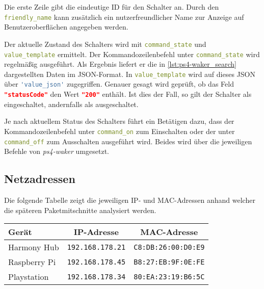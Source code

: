 Die erste Zeile gibt die eindeutige ID für den Schalter an.
Durch den \lstinline[language=yaml]{friendly_name} kann zusätzlich ein nutzerfreundlicher Name zur Anzeige auf Benutzeroberflächen angegeben werden.

Der aktuelle Zustand des Schalters wird mit \lstinline[language=yaml]{command_state}
und \\
\lstinline[language=yaml]{value_template} ermittelt.
Der Kommandozeilenbefehl unter \lstinline[language=yaml]{command_state} wird regelmäßig ausgeführt.
Als Ergebnis liefert er die in \autoref{lst:ps4-waker_search} dargestellten Daten im JSON-Format.
In \lstinline[language=yaml]{value_template} wird auf dieses JSON über
\lstinline[language=yaml]{'value_json'} zugegriffen.
Genauer gesagt wird geprüft,
ob das Feld \lstinline[language=json]{"statusCode"} den Wert
\lstinline[language=json]{"200"} enthält.
Ist dies der Fall, so gilt der Schalter als eingeschaltet, andernfalls als ausgeschaltet.



Je nach aktuellem Status des Schalters führt ein Betätigen dazu, dass der Kommandozeilenbefehl unter \lstinline[language=yaml]{command_on} zum Einschalten
oder der unter \lstinline[language=yaml]{command_off} zum Ausschalten ausgeführt wird.
Beides wird über die jeweiligen Befehle von \textit{ps4-waker} umgesetzt.

\subsection{Netzadressen}\label{sec:aufbau-adressen}
Die folgende Tabelle zeigt die jeweiligen IP- und MAC-Adressen anhand welcher die
späteren Paketmitschnitte analysiert werden. \\

\begin{center}
    \begin{tabular}{l||c|c}
        Gerät           & IP-Adresse                &  MAC-Adresse          \\
        \hline
        \hline
        Harmony Hub     & \texttt{192.168.178.21}  &  \texttt{C8:DB:26:00:D0:E9}  \\
        \hline
        Raspberry Pi    & \texttt{192.168.178.45}  &  \texttt{B8:27:EB:9F:0E:FE}  \\
        \hline
        Playstation     & \texttt{192.168.178.34}  &  \texttt{80:EA:23:19:B6:5C}   \\
    \end{tabular}
\end{center}

